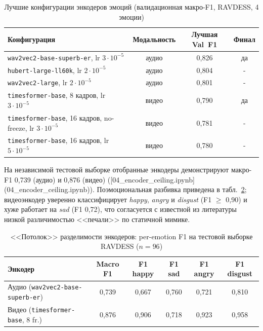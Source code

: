 \documentclass[a4paper, 12pt, oneside, openany]{article}
\begin{document}
\begin{table}[H]
\caption{Лучшие конфигурации энкодеров эмоций (валидационная макро-F1, RAVDESS, 4 эмоции)}
\label{tab:enc_sweep}
\centering
\small
\begin{tabular}{|p{5.5cm}|c|c|c|}
\hline
\textbf{Конфигурация} & \textbf{Модальность} & \textbf{Лучшая Val~F1} & \textbf{Финал} \\
\hline
\texttt{wav2vec2-base-superb-er}, lr $3\!\cdot\!10^{-5}$ & аудио & 0,826 & да \\
\hline
\texttt{hubert-large-ll60k}, lr $2\!\cdot\!10^{-5}$ & аудио & 0,804 & - \\
\hline
\texttt{wav2vec2-large}, lr $2\!\cdot\!10^{-5}$ & аудио & 0,801 & - \\
\hline
\texttt{timesformer-base}, 8 кадров, lr $3\!\cdot\!10^{-5}$ & видео & 0,790 & да \\
\hline
\texttt{timesformer-base}, 16 кадров, no-freeze, lr $3\!\cdot\!10^{-5}$ & видео & 0,781 & - \\
\hline
\texttt{timesformer-base}, 16 кадров, lr $5\!\cdot\!10^{-5}$ & видео & 0,780 & - \\
\hline
\end{tabular}
\end{table}

На независимой тестовой выборке отобранные энкодеры демонстрируют макро-F1 0,739 (аудио) и 0,876 (видео) ([04\_encoder\_ceiling.ipynb](04\_encoder\_ceiling.ipynb)). Поэмоциональная разбивка приведена в табл.~\ref{tab:enc_ceiling}; видеоэнкодер уверенно классифицирует \textit{happy}, \textit{angry} и \textit{disgust} (F1 $\geq$ 0,90) и хуже работает на \textit{sad} (F1 0,72), что согласуется с известной из литературы низкой различимостью <<печали>> по статичной мимике.

\begin{table}[H]
\caption{<<Потолок>> разделимости энкодеров: per-emotion F1 на тестовой выборке RAVDESS ($n=96$)}
\label{tab:enc_ceiling}
\centering
\small
\begin{tabular}{|p{4cm}|c|c|c|c|c|}
\hline
\textbf{Энкодер} & \textbf{Macro F1} & \textbf{F1 happy} & \textbf{F1 sad} & \textbf{F1 angry} & \textbf{F1 disgust} \\
\hline
Аудио (\texttt{wav2vec2-base-superb-er}) & 0,739 & 0,667 & 0,760 & 0,721 & 0,810 \\
\hline
Видео (\texttt{timesformer-base}, 8 fr.) & 0,876 & 0,906 & 0,718 & 0,923 & 0,958 \\
\hline
\end{tabular}
\end{table}
\end{document}
